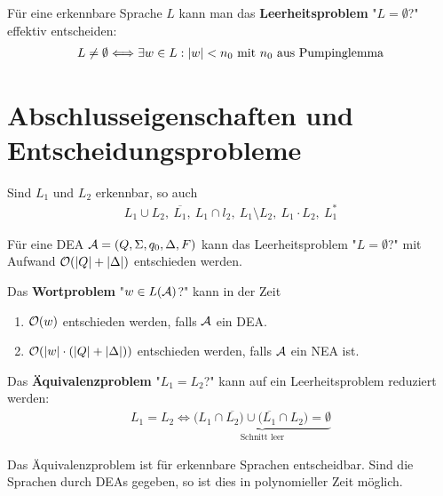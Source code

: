 \begin{satz}\label{satz3.3}
	Für eine erkennbare Sprache $L$ kann man das \textbf{Leerheitsproblem} "$L=\emptyset$?" effektiv entscheiden:
	\begin{align*}
		L\neq\emptyset\Longleftrightarrow\exists w\in L:|w|<n_0\mit n_0\text{ aus Pumpinglemma}
	\end{align*}
\end{satz}	

\section{Abschlusseigenschaften und Entscheidungsprobleme}

\begin{satz}\label{satz4.1}\enter
	Sind $L_1$ und $L_2$ erkennbar, so auch
	\begin{align*}
		L_1\cup L_2,~\overline{L_1},~L_1\cap l_2,~L_1\setminus L_2,~L_1\cdot L_2,~L_1^\ast
	\end{align*}
\end{satz}

\begin{satz}\label{satz4.3}
	Für eine DEA $\A=(Q,\Sigma,q_0,\Delta,F)$ kann das Leerheitsproblem "$L=\emptyset$?" mit Aufwand $\O(|Q|+|\Delta|)$ entschieden werden.
\end{satz}

\begin{satz}\label{satz4.4+4.5}
	Das \textbf{Wortproblem} "$w\in L(\A)$?" kann in der Zeit
	\begin{enumerate}
		\item $\O(w)$ entschieden werden, falls $\A$ ein DEA.
		\item $\O(|w|\cdot(|Q|+|\Delta|))$ entschieden werden, falls $\A$ ein NEA ist.
	\end{enumerate}
\end{satz}

Das \textbf{Äquivalenzproblem} "$L_1=L_2$?" kann auf ein Leerheitsproblem reduziert werden:
\begin{align*}
	L_1=L_2\Longleftrightarrow\underbrace{\big(L_1\cap\overline{L_2}\big)\cup\big(\overline{L_1}\cap L_2\big)=\emptyset}_{\text{Schnitt leer}}
\end{align*}

\begin{satz}\label{satz4.6}
	Das Äquivalenzproblem ist für erkennbare Sprachen entscheidbar.
	Sind die Sprachen durch DEAs gegeben, so ist dies in polynomieller Zeit möglich.
\end{satz}

